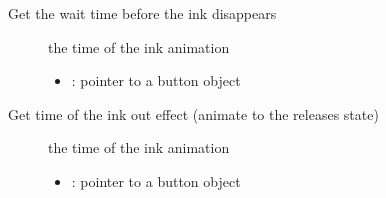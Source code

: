 \documentclass[letterpaper,10pt,english]{sphinxmanual}
\begin{document}

\begin{fulllineitems}
\label{\detokenize{object-types/btn:_CPPv424lv_btn_get_ink_wait_timePK8lv_obj_t}}%
\pysigstartmultiline
{}\label{\detokenize{object-types/btn:lv__btn_8h_1a855e2f009f9c5599f709ffdba60a4389}}%
\pysigstopmultiline
Get the wait time before the ink disappears \begin{description}
\item[{}] \leavevmode
the time of the ink animation 

\item[{}] \leavevmode\begin{itemize}
\item {} 
: pointer to a button object 

\end{itemize}

\end{description}


\end{fulllineitems}


\begin{fulllineitems}
\label{\detokenize{object-types/btn:_CPPv423lv_btn_get_ink_out_timePK8lv_obj_t}}%
\pysigstartmultiline
{}\label{\detokenize{object-types/btn:lv__btn_8h_1af4ed4e7be615fa001164002eb55d1461}}%
\pysigstopmultiline
Get time of the ink out effect (animate to the releases state) \begin{description}
\item[{}] \leavevmode
the time of the ink animation 

\item[{}] \leavevmode\begin{itemize}
\item {} 
: pointer to a button object 

\end{itemize}

\end{description}


\end{fulllineitems}
\end{document}
